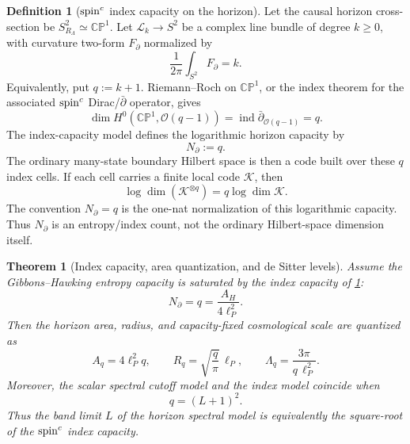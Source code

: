 \documentclass[aps,prd,reprint,nofootinbib,superscriptaddress,floatfix]{revtex4-2}
\numberwithin{equation}{section}
\theoremstyle{definition}
\newtheorem{definition}{Definition}[section]
\theoremstyle{plain}
\newtheorem{theorem}{Theorem}[section]
\newcommand{\Ncap}{N_{\partial}}
\begin{document}
\begin{definition}[\texorpdfstring{\({\rm spin}^c\)}{spin-c} index capacity on the horizon]
\label{def:spinc-index-capacity}
Let the causal horizon cross-section be \(S^2_{R_\Lambda}\simeq\mathbb{CP}^1\).  Let
\(\mathcal L_k\to S^2\) be a complex line bundle of degree \(k\ge0\), with curvature
two-form \(F_\partial\) normalized by
\begin{equation}
\frac{1}{2\pi}\int_{S^2}F_\partial=k .
\end{equation}
Equivalently, put \(q:=k+1\).  Riemann--Roch on \(\mathbb{CP}^1\), or the
index theorem for the associated \({\rm spin}^c\) Dirac/\(\bar\partial\) operator,
gives \cite{AtiyahSinger1963,Abrikosov2002}
\begin{equation}
\boxed{
\dim H^0(\mathbb{CP}^1,\mathcal O(q-1))
=
\operatorname{ind}\bar\partial_{\mathcal O(q-1)}
=
q .
}
\end{equation}
The index-capacity model defines the logarithmic horizon capacity by
\begin{equation}
\boxed{
\Ncap:=q .
}
\end{equation}
The ordinary many-state boundary Hilbert space is then a code built over
these \(q\) index cells.  If each cell carries a finite local code
\(\mathcal K\), then
\[
\log\dim(\mathcal K^{\otimes q})=q\log\dim\mathcal K .
\]
The convention \(\Ncap=q\) is the one-nat normalization of this logarithmic
capacity.  Thus \(\Ncap\) is an entropy/index count, not the ordinary
Hilbert-space dimension itself.
\end{definition}

\begin{theorem}[Index capacity, area quantization, and de Sitter levels]
\label{thm:index-capacity}
Assume the Gibbons--Hawking entropy capacity is saturated by the index
capacity of \cref{def:spinc-index-capacity}:
\begin{equation}
\Ncap=q=\frac{A_H}{4\ell_P^2}.
\end{equation}
Then the horizon area, radius, and capacity-fixed cosmological scale are
quantized as
\begin{equation}
\boxed{
A_q=4\ell_P^2q,\qquad
R_q=\sqrt{\frac{q}{\pi}}\,\ell_P,\qquad
\Lambda_q=\frac{3\pi}{q\,\ell_P^2}.
}
\end{equation}
Moreover, the scalar spectral cutoff model and the index model coincide
when
\begin{equation}
\boxed{
q=(L+1)^2.
}
\end{equation}
Thus the band limit \(L\) of the horizon spectral model is equivalently
the square-root of the \({\rm spin}^c\) index capacity.
\end{theorem}
\end{document}

